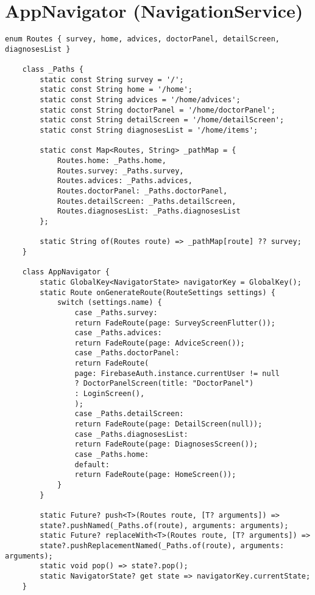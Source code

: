 \pagebreak
\tocless\section{AppNavigator (NavigationService)}
\begin{lstlisting}[caption=AppNavigator Class]
	enum Routes { survey, home, advices, doctorPanel, detailScreen, diagnosesList }
	
	class _Paths {
		static const String survey = '/';
		static const String home = '/home';
		static const String advices = '/home/advices';
		static const String doctorPanel = '/home/doctorPanel';
		static const String detailScreen = '/home/detailScreen';
		static const String diagnosesList = '/home/items';
		
		static const Map<Routes, String> _pathMap = {
			Routes.home: _Paths.home,
			Routes.survey: _Paths.survey,
			Routes.advices: _Paths.advices,
			Routes.doctorPanel: _Paths.doctorPanel,
			Routes.detailScreen: _Paths.detailScreen,
			Routes.diagnosesList: _Paths.diagnosesList
		};
		
		static String of(Routes route) => _pathMap[route] ?? survey;
	}
	
	class AppNavigator {
		static GlobalKey<NavigatorState> navigatorKey = GlobalKey();
		static Route onGenerateRoute(RouteSettings settings) {
			switch (settings.name) {
				case _Paths.survey:
				return FadeRoute(page: SurveyScreenFlutter());
				case _Paths.advices:
				return FadeRoute(page: AdviceScreen());
				case _Paths.doctorPanel:
				return FadeRoute(
				page: FirebaseAuth.instance.currentUser != null
				? DoctorPanelScreen(title: "DoctorPanel")
				: LoginScreen(),
				);
				case _Paths.detailScreen:
				return FadeRoute(page: DetailScreen(null));
				case _Paths.diagnosesList:
				return FadeRoute(page: DiagnosesScreen());
				case _Paths.home:
				default:
				return FadeRoute(page: HomeScreen());
			}
		}
		
		static Future? push<T>(Routes route, [T? arguments]) =>
		state?.pushNamed(_Paths.of(route), arguments: arguments);
		static Future? replaceWith<T>(Routes route, [T? arguments]) =>
		state?.pushReplacementNamed(_Paths.of(route), arguments: arguments);
		static void pop() => state?.pop();
		static NavigatorState? get state => navigatorKey.currentState;
	}
\end{lstlisting}

